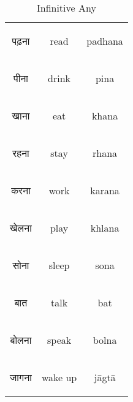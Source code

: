 \begin{table}[H]
    \centering
    \begin{tabular}{c|c|c}
        \begin{hindi} पढ़ना \end{hindi} & read &  padhana\\
        \begin{hindi} पीना \end{hindi} & drink &  pina \\
        \begin{hindi} खाना \end{hindi} & eat &  khana \\
        \begin{hindi} रहना \end{hindi} & stay &  rhana \\
        \begin{hindi} करना \end{hindi} & work &  karana \\
        \begin{hindi} खेलना \end{hindi} & play &  khlana \\
        \begin{hindi} सोना \end{hindi} & sleep & sona \\
        \begin{hindi} बात \end{hindi} & talk & bat \\
        \begin{hindi} बोलना \end{hindi} & speak & bolna \\
        \begin{hindi} जागना \end{hindi} & wake up & jāgtā \\

    \end{tabular}
    \caption{Infinitive Any}
    \label{tab:verbs_any}
\end{table}




